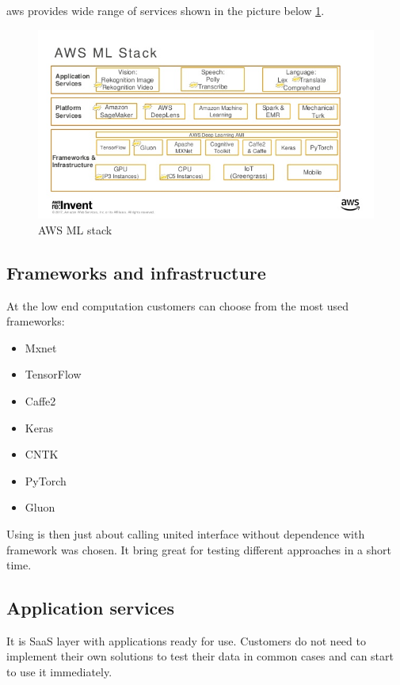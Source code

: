 \documentclass[thesis=M,english]{FITthesis}[2012/06/26]
\begin{document}
\acrshort{aws} provides wide range of services shown in the picture below \ref{fig:ml_aws_sagemaker_stack}.

\begin{figure}[h!]\centering
	\includegraphics[width=1\textwidth]{pictures/ml_aws_sagemaker_stack}
	\caption{AWS ML stack \cite{ml_aws}}\label{fig:ml_aws_sagemaker_stack}
\end{figure}

\subsection{Frameworks and infrastructure}

At the low end computation customers can choose from the most used frameworks:
\begin{itemize}[nosep]
	\item Mxnet 
	\item TensorFlow 
	\item Caffe2
	\item Keras
	\item CNTK
	\item PyTorch
	\item Gluon
\end{itemize}

Using is then just about calling united interface without dependence with framework was chosen. It bring great for testing different approaches in a short time.

\subsection{Application services}

It is SaaS layer with applications ready for use. Customers do not need to implement their own solutions to test their data in common cases and can start to use it immediately.
\end{document}
